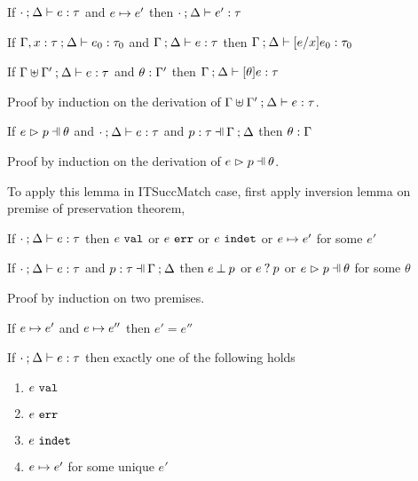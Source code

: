 \begin{thm}[Preservation]
  \label{thrm:preservation}
  If $\cdot \mathbin{;} \Delta \vdash e : \tau$ and $e \mapsto e'$
  then $\cdot \mathbin{;} \Delta \vdash e' : \tau$
\end{thm}

\begin{lem}[Substitution]
  \label{lemma:substitution}
  If $\Gamma, x : \tau \mathbin{;} \Delta \vdash e_0 : \tau_0$ and $\Gamma \mathbin{;} \Delta \vdash e : \tau$
  then $\Gamma \mathbin{;} \Delta \vdash [e/x]e_0 : \tau_0$
\end{lem}

\begin{lem}
  \label{lemma:simult-substitution}
  If $\Gamma \uplus \Gamma' \mathbin{;} \Delta \vdash e : \tau$ and $\theta : \Gamma'$
  then $\Gamma \mathbin{;} \Delta \vdash [\theta]e : \tau$
\end{lem}
Proof by induction on the derivation of $\Gamma \uplus \Gamma' \mathbin{;} \Delta \vdash e : \tau$.

\begin{lem}
  \label{lemma:subs-typing}
  If $\hpatmatch{e}{p}{\theta}$ and $\cdot \mathbin{;} \Delta \vdash e : \tau$ and $\hpattyp{p}{\tau}{\Gamma}{\Delta}$
  then $\theta : \Gamma$
\end{lem}
Proof by induction on the derivation of $\hpatmatch{e}{p}{\theta}$.

To apply this lemma in ITSuccMatch case, first apply inversion lemma on premise of preservation theorem,

\begin{thm}[Progress]
  \label{thrm:progrs}
  If $\cdot \mathbin{;} \Delta \vdash e : \tau$
  then $e ~\mathtt{val}$ or $e ~\mathtt{err}$ or $e ~\mathtt{indet}$ or $e \mapsto e'$ for some $e'$
\end{thm}

\begin{lem}
  \label{lemma:match-progress}
  If $\cdot \mathbin{;} \Delta \vdash e : \tau$ and $\hpattyp{p}{\tau}{\Gamma}{\Delta}$
  then $e \mathbin{\bot} p$ or $e \mathbin{?} p$ or $\hpatmatch{e}{p}{\theta}$ for some $\theta$
\end{lem}
Proof by induction on two premises.

\begin{thm}
  \label{thrm:step-determinism}
  If $e \mapsto e'$ and $e \mapsto e''$ then $e' = e''$
\end{thm}

\begin{thm}[Determinism]
  \label{thrm:determinism}
  If $\cdot \mathbin{;} \Delta \vdash e : \tau$ then exactly one of the following holds
  \begin{enumerate}
    \item $e ~\mathtt{val}$
    \item $e ~\mathtt{err}$
    \item $e ~\mathtt{indet}$
    \item $e \mapsto e'$ for some unique $e'$
  \end{enumerate}
\end{thm}

